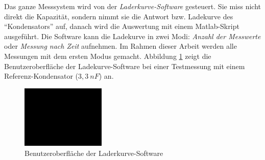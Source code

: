 Das ganze Messsystem wird von der \textit{Laderkurve-Software} gesteuert.
Sie miss nicht direkt die Kapazität, sondern nimmt sie die Antwort bzw. Ladekurve des ``Kondensators'' auf, danach wird die Auswertung mit einem Matlab-Skript ausgeführt.
Die Software kann die Ladekurve in zwei Modi: \emph{Anzahl der Messwerte} oder \emph{Messung nach Zeit} aufnehmen.
Im Rahmen dieser Arbeit werden alle Messungen mit dem ersten Modus gemacht.
Abbildung \ref{fig:gui_der_laderkurve_software} zeigt die Benutzeroberfläche der Ladekurve-Software bei einer Testmessung mit einem Referenz-Kondensator ($3,3 \ nF$) an.
\begin{figure}[htb]
    \centering
    \includegraphics[width=4cm]{./images/blank_img.jpg}
    \caption{Benutzeroberfläche der Laderkurve-Software}
    \label{fig:gui_der_laderkurve_software}
\end{figure}


